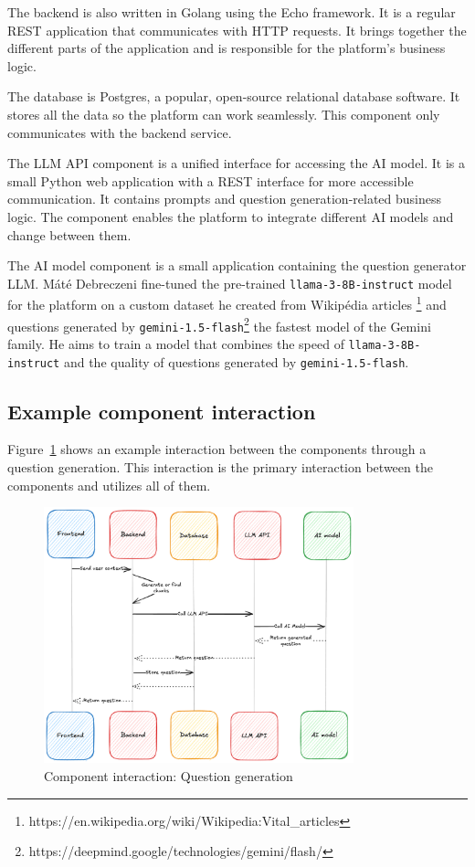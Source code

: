 The backend is also written in Golang using the Echo framework. It is a regular REST application that communicates with HTTP requests. It brings together the different parts of the application and is responsible for the platform's business logic.

The database is Postgres, a popular, open-source relational database software. It stores all the data so the platform can work seamlessly. This component only communicates with the backend service.

The LLM API component is a unified interface for accessing the AI model. It is a small Python web application with a REST interface for more accessible communication. It contains prompts and question generation-related business logic. The component enables the platform to integrate different AI models and change between them.

The AI model component is a small application containing the question generator LLM. Máté Debreczeni fine-tuned the pre-trained \texttt{llama-3-8B-instruct} model for the platform on a custom dataset he created from Wikipédia articles \footnote{https://en.wikipedia.org/wiki/Wikipedia:Vital_articles} and questions generated by \texttt{gemini-1.5-flash}\footnote{https://deepmind.google/technologies/gemini/flash/} the fastest model of the Gemini family. He aims to train a model that combines the speed of \texttt{llama-3-8B-instruct} and the quality of questions generated by \texttt{gemini-1.5-flash}.

\subsection{Example component interaction}

Figure~\ref{fig:component-interaction} shows an example interaction between the components through a question generation. This interaction is the primary interaction between the components and utilizes all of them.

\begin{figure}[!h]
    \centering
    \includegraphics[width=0.8\textwidth, keepaspectratio]{figures/component-interaction.png}
    \caption{Component interaction: Question generation}
    \label{fig:component-interaction}
\end{figure}

